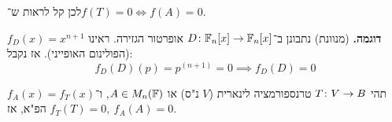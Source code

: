 \documentclass[name=רשימות אלגברה לינארית 2א]{../../../tex/classes/megasumPreamble}
\begin{document}
	
	לכן קל לראות ש־$f(T) = 0 \iff f(A) = 0$. 
	
	
	\textbf{דוגמה. }(מנוונת) נתבונן ב־$D \colon \mathbb{F}_n[x] \to \mathbb{F}_n[x]$ אופרטור הגזירה. ראינו $f_D(x) = x^{n + 1}$ (הפולינום האופייני). אז נקבל: 
	\[ f_D(D)(p) = p^{(n + 1)} = 0 \implies f_D(D) = 0 \]
	
	\begin{Theorem}
		תהי $T \colon V \to B$ טרנספורמציה לינארית ($V$ נ"ס) או $A \in M_n(\mathbb{F})$, ו־$f_A(x) = f_T(x)$ הפ"א, אז $f_T(T) = 0, \ f_A(A) = 0$. 
	\end{Theorem}
	
	
\end{document}
